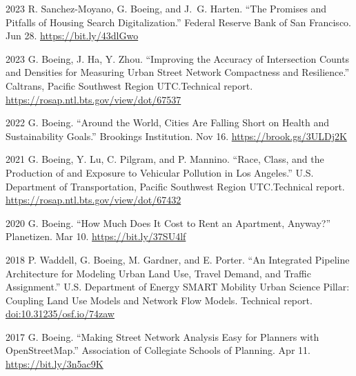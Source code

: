 \documentclass[11pt,letterpaper]{report}
\begin{document}
    \begin{tablist}

        \item[2023] \tab{}R. Sanchez-Moyano, G. Boeing, and J.~G. Harten. \enquote{The Promises and Pitfalls of Housing Search Digitalization.} Federal Reserve Bank of San Francisco. Jun 28. \href{https://bit.ly/43dlGwo}{https://bit.ly/43dlGwo}

        \item[2023] \tab{}G. Boeing, J. Ha, Y. Zhou. \enquote{Improving the Accuracy of Intersection Counts and Densities for Measuring Urban Street Network Compactness and Resilience.} Caltrans, Pacific Southwest Region UTC.\@ Technical report. \href{https://rosap.ntl.bts.gov/view/dot/67537}{https://rosap.ntl.bts.gov/view/dot/67537}

        \item[2022] \tab{}G. Boeing. \enquote{Around the World, Cities Are Falling Short on Health and Sustainability Goals.} Brookings Institution. Nov 16. \href{https://brook.gs/3ULDj2K}{https://brook.gs/3ULDj2K}

        \item[2021] \tab{}G. Boeing, Y. Lu, C. Pilgram, and P. Mannino. \enquote{Race, Class, and the Production of and Exposure to Vehicular Pollution in Los Angeles.} U.S. Department of Transportation, Pacific Southwest Region UTC.\@ Technical report. \href{https://rosap.ntl.bts.gov/view/dot/67432}{https://rosap.ntl.bts.gov/view/dot/67432}

        \item[2020] \tab{}G. Boeing. \enquote{How Much Does It Cost to Rent an Apartment, Anyway?} Planetizen. Mar 10. \href{https://bit.ly/37SU4lf}{https://bit.ly/37SU4lf}

        \item[2018] \tab{}P. Waddell, G. Boeing, M. Gardner, and E. Porter. \enquote{An Integrated Pipeline Architecture for Modeling Urban Land Use, Travel Demand, and Traffic Assignment.} U.S. Department of Energy SMART Mobility Urban Science Pillar: Coupling Land Use Models and Network Flow Models. Technical report. \href{https://doi.org/10.31235/osf.io/74zaw}{doi:10.31235/osf.io/74zaw}

        \item[2017] \tab{}G. Boeing. \enquote{Making Street Network Analysis Easy for Planners with OpenStreetMap.} Association of Collegiate Schools of Planning. Apr 11. \href{https://bit.ly/3n5ac9K}{https://bit.ly/3n5ac9K}

    \end{tablist}
\end{document}
